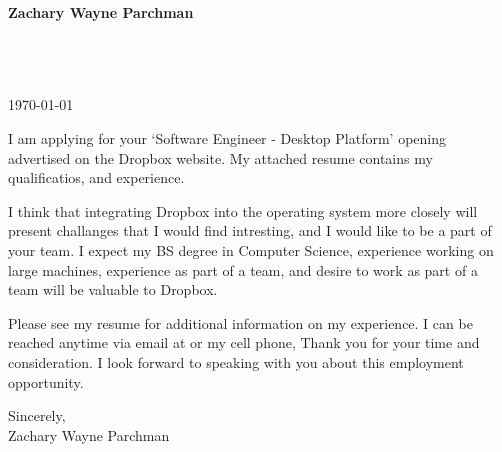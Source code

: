 \documentclass[10pt]{article}
\begin{document}

\begin{center}
\begin{Huge}
    \bf{Zachary Wayne Parchman}
\end{Huge}
\end{center}
\vspace{10mm}

\setlength{\parskip}{5mm}

\noindent
\address{}\\
\phone{}\\
\email{}\\

\noindent
\today{}


I am applying for your `Software Engineer - Desktop Platform' opening
advertised on the Dropbox website. 
My attached resume contains my qualificatios, and experience.

I think that integrating Dropbox into the operating system more closely will
present challanges that I would find intresting, and I would like to be a part
of your team. I expect my BS degree in Computer Science, experience working on
large machines, experience as part of a team, and desire to work as part of a
team will be valuable to
Dropbox.

Please see my resume for additional information on my experience.  I can be
reached anytime via email at \email{} or my cell phone,
\phone{} Thank you for your time and consideration. I look forward to
speaking with you about this employment opportunity.

\noindent
Sincerely,\\
\hspace*{5mm}Zachary Wayne Parchman
\end{document}
